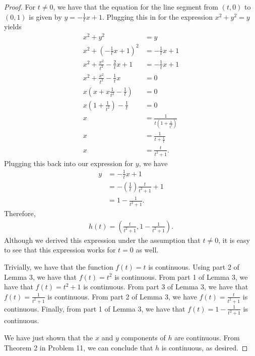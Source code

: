 \documentclass[10pt,a4paper]{article}
\theoremstyle{theorem}
\theoremstyle{definition}
\begin{document}
\begin{proof}
For $t \not = 0$, we have that the equation for the line segment from $(t, 0)$ to $(0, 1)$ is given by $y = -\frac{1}{t}x + 1$. Plugging this in for the expression $x^2 + y^2 = y$ yields
\begin{align*}
x^2 + y^2 &= y\\
x^2 + (-\frac{1}{t}x + 1)^2 &= -\frac{1}{t}x + 1\\
x^2 + \frac{x^2}{t^2} - \frac{2}{t}x + 1 &= -\frac{1}{t}x + 1\\
x^2 + \frac{x^2}{t^2} - \frac{1}{t}x &= 0 \\
x(x + x \frac{1}{t^2} - \frac{1}{t}) &= 0\\
x(1 +  \frac{1}{t^2}) - \frac{1}{t} &= 0\\
x &= \frac{1}{t(1 +  \frac{1}{t^2})}\\
x &= \frac{1}{t +  \frac{1}{t}}\\
x &= \frac{t}{t^2 +  1}.
\end{align*}
Plugging this back into our expression for $y$, we have
\begin{align*}
y &= -\frac{1}{t}x + 1\\
&= -\left(\frac{1}{t}\right)\frac{t}{t^2 +  1} + 1\\
&= 1 - \frac{1}{t^2 +  1}.
\end{align*}
Therefore,
\begin{align*}
h(t) = (\frac{t}{t^2 +  1}, 1 - \frac{1}{t^2 +  1}).
\end{align*}
Although we derived this expression under the assumption that $t \not = 0$, it is easy to see that this expression works for $t = 0$ as well.

Trivially, we have that the function $f(t) = t$ is continuous. Using part 2 of Lemma 3, we have that $f(t) = t^2$ is continuous. From part 1 of Lemma 3, we have that $f(t) = t^2 + 1$ is continuous. From part 3 of Lemma 3, we have that $f(t) = \frac{1}{t^2 + 1}$ is continuous.  From part 2 of Lemma 3, we have $f(t) = \frac{t}{t^2 + 1}$ is continuous. Finally, from part 1 of Lemma 3, we have that $f(t) = 1 - \frac{1}{t^2 +  1}$ is continuous. 

We have just shown that the $x$ and $y$ components of $h$ are continuous. From Theorem 2 in Problem 11, we can conclude that $h$ is continuous, as desired.
\end{proof}
\end{document}

